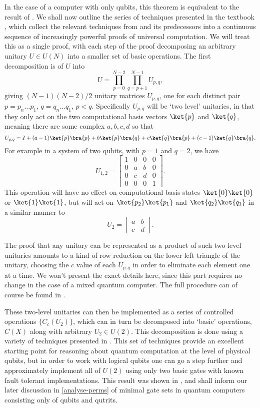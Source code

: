 In the case of a computer with only qubits, this theorem is equivalent to the result of \cite{cnot-decomposition}. We shall now outline the series of techniques presented in the textbook \cite{textbook}, which collect the relevant techniques from \cite{cnot-decomposition} and its predecessors into a continuous sequence of increasingly powerful proofs of universal computation. We will treat this as a single proof, with each step of the proof decomposing an arbitrary unitary $U \in U(N)$ into a smaller set of basic operations. The first decomposition is of $U$ into
\[U = \prod_{p=0}^{N-2}\prod_{q=p+1}^{N-1}U_{p,q},\]
giving $(N-1)(N-2)/2$ unitary matrices $U_{p,q}$, one for each distinct pair $p = p_n\dots p_1$, $q = q_n\dots q_1$, $p < q$. Specifically $U_{p,q}$ will be `two level' unitaries, in that they only act on the two computational basis vectors $\ket{p}$ and $\ket{q}$, meaning there are some complex $a, b, c, d$ so that
\[U_{p,q} = I + (a-1)\ket{p}\bra{p} + b\ket{p}\bra{q}+ c\ket{q}\bra{p}+ (c-1)\ket{q}\bra{q}.\]
For example in a system of two qubits, with $p = 1$ and $q = 2$, we have
\[U_{1,2} = \begin{bmatrix}
1 & 0 & 0 & 0 \\
0 & a & b & 0 \\
0 & c & d & 0 \\
0 & 0 & 0 & 1
\end{bmatrix}.\]
This operation will have no effect on computational basis states $\ket{0}\ket{0}$ or $\ket{1}\ket{1}$, but will act on $\ket{p_2}\ket{p_1}$ and $\ket{q_2}\ket{q_1}$ in a similar manner to
\[U_2 = \begin{bmatrix}
a & b \\
c & d
\end{bmatrix}.\]

The proof that any unitary can be represented as a product of such two-level unitaries amounts to a kind of row reduction on the lower left triangle of the unitary, choosing the $c$ value of each $U_{p,q}$ in order to eliminate each element one at a time. We won't present the exact details here, since this part requires no change in the case of a mixed quantum computer. The full procedure can of course be found in \cite{textbook}.

These two-level unitaries can then be implemented as a series of controlled operations $\{C_c(U_2)\}$, which can in turn be decomposed into `basic' operations, $C(X)$ along with arbitrary $U_2 \in U(2)$. This decomposition is done using a variety of techniques presented in \cite{cnot-decomposition}. This set of techniques provide an excellent starting point for reasoning about quantum computation at the level of physical qubits, but in order to work with logical qubits one can go a step further and approximately implement all of $U(2)$ using only two basic gates with known fault tolerant implementations. This result was shown in \cite{universal-qubit}, and shall inform our later discussion in \autoref{analyse-perms} of minimal gate sets in quantum computers consisting only of qubits and qutrits.

